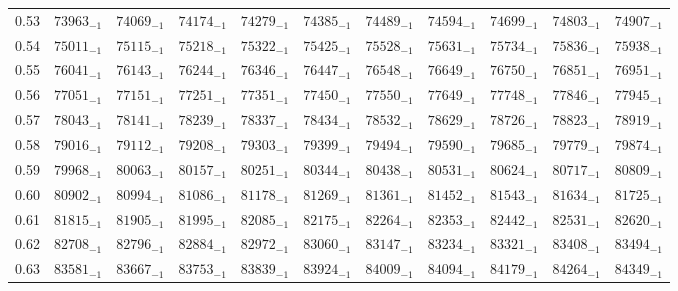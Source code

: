\documentclass[10pt, a4paper]{article}
\begin{document}
\begin{center}
\begin{longtable}{c | c c c c c | c c c c c}
        0.53 & \({73963}_{-1}\) & \({74069}_{-1}\) & \({74174}_{-1}\) & \({74279}_{-1}\) & \({74385}_{-1}\) & \({74489}_{-1}\) & \({74594}_{-1}\) & \({74699}_{-1}\) & \({74803}_{-1}\) & \({74907}_{-1}\)\\
        0.54 & \({75011}_{-1}\) & \({75115}_{-1}\) & \({75218}_{-1}\) & \({75322}_{-1}\) & \({75425}_{-1}\) & \({75528}_{-1}\) & \({75631}_{-1}\) & \({75734}_{-1}\) & \({75836}_{-1}\) & \({75938}_{-1}\)\\
        0.55 & \({76041}_{-1}\) & \({76143}_{-1}\) & \({76244}_{-1}\) & \({76346}_{-1}\) & \({76447}_{-1}\) & \({76548}_{-1}\) & \({76649}_{-1}\) & \({76750}_{-1}\) & \({76851}_{-1}\) & \({76951}_{-1}\)\\
        0.56 & \({77051}_{-1}\) & \({77151}_{-1}\) & \({77251}_{-1}\) & \({77351}_{-1}\) & \({77450}_{-1}\) & \({77550}_{-1}\) & \({77649}_{-1}\) & \({77748}_{-1}\) & \({77846}_{-1}\) & \({77945}_{-1}\)\\
        0.57 & \({78043}_{-1}\) & \({78141}_{-1}\) & \({78239}_{-1}\) & \({78337}_{-1}\) & \({78434}_{-1}\) & \({78532}_{-1}\) & \({78629}_{-1}\) & \({78726}_{-1}\) & \({78823}_{-1}\) & \({78919}_{-1}\)\\
        0.58 & \({79016}_{-1}\) & \({79112}_{-1}\) & \({79208}_{-1}\) & \({79303}_{-1}\) & \({79399}_{-1}\) & \({79494}_{-1}\) & \({79590}_{-1}\) & \({79685}_{-1}\) & \({79779}_{-1}\) & \({79874}_{-1}\)\\
        0.59 & \({79968}_{-1}\) & \({80063}_{-1}\) & \({80157}_{-1}\) & \({80251}_{-1}\) & \({80344}_{-1}\) & \({80438}_{-1}\) & \({80531}_{-1}\) & \({80624}_{-1}\) & \({80717}_{-1}\) & \({80809}_{-1}\)\\
        0.60 & \({80902}_{-1}\) & \({80994}_{-1}\) & \({81086}_{-1}\) & \({81178}_{-1}\) & \({81269}_{-1}\) & \({81361}_{-1}\) & \({81452}_{-1}\) & \({81543}_{-1}\) & \({81634}_{-1}\) & \({81725}_{-1}\)\\
        0.61 & \({81815}_{-1}\) & \({81905}_{-1}\) & \({81995}_{-1}\) & \({82085}_{-1}\) & \({82175}_{-1}\) & \({82264}_{-1}\) & \({82353}_{-1}\) & \({82442}_{-1}\) & \({82531}_{-1}\) & \({82620}_{-1}\)\\
        0.62 & \({82708}_{-1}\) & \({82796}_{-1}\) & \({82884}_{-1}\) & \({82972}_{-1}\) & \({83060}_{-1}\) & \({83147}_{-1}\) & \({83234}_{-1}\) & \({83321}_{-1}\) & \({83408}_{-1}\) & \({83494}_{-1}\)\\
        0.63 & \({83581}_{-1}\) & \({83667}_{-1}\) & \({83753}_{-1}\) & \({83839}_{-1}\) & \({83924}_{-1}\) & \({84009}_{-1}\) & \({84094}_{-1}\) & \({84179}_{-1}\) & \({84264}_{-1}\) & \({84349}_{-1}\)\\

\end{longtable}
\end{center}
\end{document}

